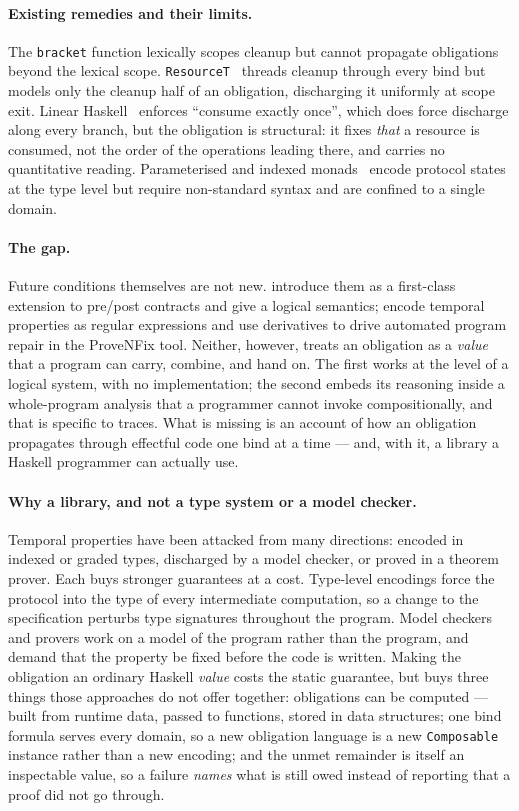 \documentclass[acmsmall,screen]{acmart}
\begin{document}
\paragraph{Existing remedies and their limits.}
The \lstinline{bracket} function lexically scopes cleanup but cannot
propagate obligations beyond the lexical scope.
\lstinline{ResourceT}~\cite{snoyman2011resourcet} threads cleanup through
every bind but models only the cleanup half of an obligation, discharging
it uniformly at scope exit.
Linear Haskell~\cite{bernardy2018linear} enforces ``consume exactly once'',
which does force discharge along every branch, but the obligation is
structural: it fixes \emph{that} a resource is consumed, not the order of the
operations leading there, and carries no quantitative reading.
Parameterised and indexed monads~\cite{atkey2009} encode protocol states at
the type level but require non-standard syntax and are confined to a single
domain.

\paragraph{The gap.}
Future conditions themselves are not new.
\citet{song2025futurecond} introduce them as a first-class extension to
pre/post contracts and give a logical semantics;
\citet{song2024provenfix} encode temporal properties as regular expressions
and use derivatives to drive automated program repair in the ProveNFix tool.
Neither, however, treats an obligation as a \emph{value} that a program can
carry, combine, and hand on.
The first works at the level of a logical system, with no implementation;
the second embeds its reasoning inside a whole-program analysis that a
programmer cannot invoke compositionally, and that is specific to traces.
What is missing is an account of how an obligation propagates through
effectful code one bind at a time --- and, with it, a library a Haskell
programmer can actually use.

\paragraph{Why a library, and not a type system or a model checker.}
Temporal properties have been attacked from many directions: encoded in
indexed or graded types, discharged by a model checker, or proved in a
theorem prover.
Each buys stronger guarantees at a cost.
Type-level encodings force the protocol into the type of every
intermediate computation, so a change to the specification perturbs
type signatures throughout the program.
Model checkers and provers work on a model of the program rather than the
program, and demand that the property be fixed before the code is written.
Making the obligation an ordinary Haskell \emph{value} costs the static
guarantee, but buys three things those approaches do not offer together:
obligations can be computed --- built from runtime data, passed to
functions, stored in data structures;
one bind formula serves every domain, so a new obligation language is a new
\lstinline{Composable} instance rather than a new encoding;
and the unmet remainder is itself an inspectable value, so a failure
\emph{names} what is still owed instead of reporting that a proof did not
go through.
\end{document}
